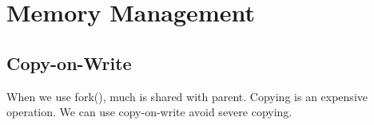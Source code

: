 
\chapter{Memory Management}





\section{Copy-on-Write}

When we use fork(), much is shared with parent. 
Copying is an expensive operation. 
We can use copy-on-write avoid severe copying.
